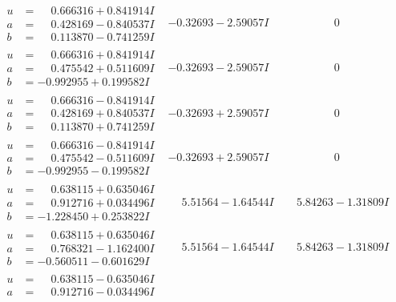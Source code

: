 \documentclass[1p]{elsarticle_modified}
\theoremstyle{definition}
\begin{document}
$$\begin{array}{c|c|c}
\begin{aligned}
u &= \phantom{-}0.666316 + 0.841914 I \\
a &= \phantom{-}0.428169 - 0.840537 I \\
b &= \phantom{-}0.113870 - 0.741259 I\end{aligned}
 & -0.32693 - 2.59057 I & \phantom{-0.000000 } 0 \\ \hline\begin{aligned}
u &= \phantom{-}0.666316 + 0.841914 I \\
a &= \phantom{-}0.475542 + 0.511609 I \\
b &= -0.992955 + 0.199582 I\end{aligned}
 & -0.32693 - 2.59057 I & \phantom{-0.000000 } 0 \\ \hline\begin{aligned}
u &= \phantom{-}0.666316 - 0.841914 I \\
a &= \phantom{-}0.428169 + 0.840537 I \\
b &= \phantom{-}0.113870 + 0.741259 I\end{aligned}
 & -0.32693 + 2.59057 I & \phantom{-0.000000 } 0 \\ \hline\begin{aligned}
u &= \phantom{-}0.666316 - 0.841914 I \\
a &= \phantom{-}0.475542 - 0.511609 I \\
b &= -0.992955 - 0.199582 I\end{aligned}
 & -0.32693 + 2.59057 I & \phantom{-0.000000 } 0 \\ \hline\begin{aligned}
u &= \phantom{-}0.638115 + 0.635046 I \\
a &= \phantom{-}0.912716 + 0.034496 I \\
b &= -1.228450 + 0.253822 I\end{aligned}
 & \phantom{-}5.51564 - 1.64544 I & \phantom{-}5.84263 - 1.31809 I \\ \hline\begin{aligned}
u &= \phantom{-}0.638115 + 0.635046 I \\
a &= \phantom{-}0.768321 - 1.162400 I \\
b &= -0.560511 - 0.601629 I\end{aligned}
 & \phantom{-}5.51564 - 1.64544 I & \phantom{-}5.84263 - 1.31809 I \\ \hline\begin{aligned}
u &= \phantom{-}0.638115 - 0.635046 I \\
a &= \phantom{-}0.912716 - 0.034496 I \\

\end{aligned}
\end{array}$$
\end{document}
